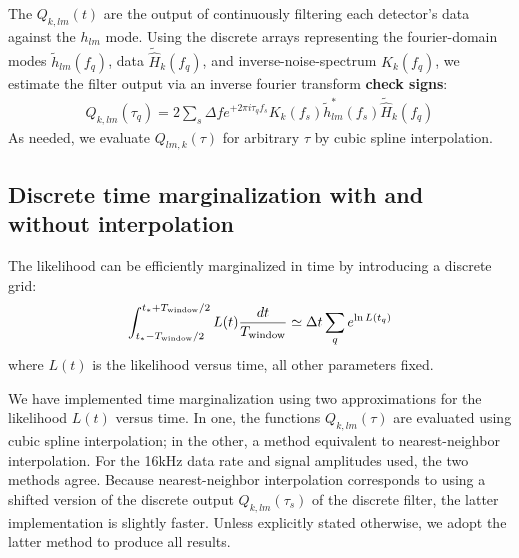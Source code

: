 \documentclass[twocolumn,prd,nofootinbib]{revtex4}
\begin{document}
The $Q_{k,lm}(t)$ are the output of continuously filtering each detector's data against the $h_{lm}$ mode.  Using the
discrete arrays representing the fourier-domain modes $\tilde{h}_{lm}(f_q)$, data $\tilde{\hat{H}}_k(f_q)$, and inverse-noise-spectrum  $K_k(f_q)$, we estimate the
filter output via an inverse fourier transform \textbf{check signs}:
\begin{eqnarray}
Q_{k,lm}(\tau_q) = 2 \sum_s \Delta f e^{+2\pi i \tau_q f_s} K_k(f_s) \tilde{h}^*_{lm}(f_s) \tilde{\hat{H}}_k(f_q)
\end{eqnarray}
%
As needed, we evaluate $Q_{lm,k}(\tau)$ for arbitrary $\tau$ by  cubic spline interpolation.  




\subsection{Discrete time marginalization with and without interpolation}

The likelihood can be efficiently marginalized in time by introducing a discrete grid:
\begin{eqnarray}
\int_{t_*-T_{\rm window}/2 }^{t_*+T_{\rm window}/2}L(t) \frac{dt}{T_{\rm window}} \simeq \Delta t \sum_q e^{\ln L(t_q)}
\end{eqnarray}
where $L(t) $ is the likelihood versus time, all other parameters fixed.   
%

We have implemented time marginalization using two approximations for the likelihood $L(t)$ versus time.  In one,  the  functions
$Q_{k,lm}(\tau)$ are evaluated using cubic spline interpolation; in the other, a method equivalent to nearest-neighbor interpolation.  For
the 16kHz data rate and signal amplitudes used, the two methods agree.   Because nearest-neighbor interpolation
corresponds to using a shifted version of the  discrete output $Q_{k,lm}(\tau_s)$ of the discrete filter, the latter
implementation is slightly faster.   
%
Unless explicitly stated otherwise, we adopt the latter method to produce all results.  
\end{document}
